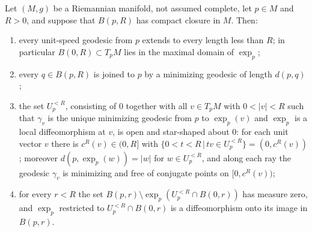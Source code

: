 \begin{lemma}
\label{lem:localized-cut-locus}
Let $(M,g)$ be a Riemannian manifold, not assumed complete, let
$p\in M$ and $R>0$, and suppose that $B(p,R)$ has compact closure
in $M$. Then:
\begin{enumerate}
\item every unit-speed geodesic from $p$ extends to every length
less than $R$; in particular
$B(0,R)\subset T_pM$ lies in the maximal domain of $\exp_p$;
\item every $q\in B(p,R)$ is joined to $p$ by a minimizing geodesic
of length $d(p,q)$;
\item the set $U_p^{<R}$, consisting of $0$ together with all $v\in
T_pM$ with $0<|v|<R$ such that $\gamma_v$ is the unique minimizing
geodesic from $p$ to $\exp_p(v)$ and $\exp_p$ is a local
diffeomorphism at $v$, is open and star-shaped about $0$: for each
unit vector $v$ there is $c^R(v)\in(0,R]$ with $\{0<t<R\,|\,tv\in
U_p^{<R}\}=(0,c^R(v))$; moreover $d(p,\exp_p(w))=|w|$ for $w\in
U_p^{<R}$, and along each ray the geodesic $\gamma_v$ is minimizing
and free of conjugate points on $[0,c^R(v))$;
\item for every $r<R$ the set $B(p,r)\setminus
\exp_p\left(U_p^{<R}\cap B(0,r)\right)$ has measure zero, and
$\exp_p$ restricted to $U_p^{<R}\cap B(0,r)$ is a
diffeomorphism onto its image in $B(p,r)$.
\end{enumerate}
\end{lemma}

